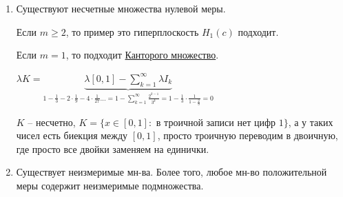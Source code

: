 \begin{remark}
    \begin{enumerate}
        \item {
            Существуют несчетные множества нулевой меры.
            
            Если $m \geq 2$, то пример это гиперплоскость $H_1 (c)$ подходит.

            Если $m = 1$, то подходит \href{https://ru.wikipedia.org/wiki/%D0%9A%D0%B0%D0%BD%D1%82%D0%BE%D1%80%D0%BE%D0%B2%D0%BE_%D0%BC%D0%BD%D0%BE%D0%B6%D0%B5%D1%81%D1%82%D0%B2%D0%BE}{Канторого множество}.

            $\lambda K = \underbrace{\lambda [0, 1] - \sum_{k=1}^{\infty} \lambda I_k}_{1 - \frac{1}{3} - 2 \cdot \frac{1}{9} - 4 \cdot \frac{1}{27} \dots = 1 - \sum_{k=1}^{\infty}\frac{2^{k-1}}{3^k} = 1 - \frac{1}{3} \cdot \frac{1}{1 - \frac{2}{3}} = 0 }$

            $K$ -- несчетно, $K = \{ x \in [0, 1]: \text{ в троичной записи нет цифр 1} \}$, а у таких чисел есть биекция между $[0, 1]$, просто троичную переводим в двоичную, где просто все двойки заменяем на единички.
        }
        \item {
            Существует неизмеримые мн-ва. Более того, любое мн-во положительной меры содержит неизмеримые подмножества.
        }
    \end{enumerate}
\end{remark}

